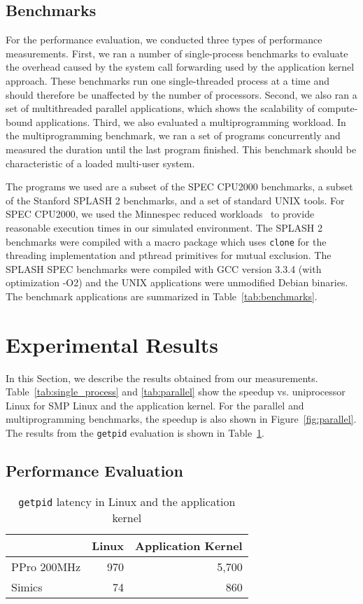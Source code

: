 \subsection{Benchmarks}
For the performance evaluation, we conducted three types of performance
measurements. First, we ran a number of single-process benchmarks to evaluate
the overhead caused by the system call forwarding used by the application
kernel approach. These benchmarks run one single-threaded process at a time
and should therefore be unaffected by the number of processors. Second, we
also ran a set of multithreaded parallel applications, which shows the
scalability of compute-bound applications. Third, we also evaluated a
multiprogramming workload. In the multiprogramming benchmark, we ran a set of
programs concurrently and measured the duration until the last program
finished. This benchmark should be characteristic of a loaded multi-user
system.

The programs we used are a subset of the SPEC CPU2000 benchmarks, a subset of
the Stanford SPLASH 2 benchmarks, and a set of standard UNIX tools. For SPEC
CPU2000, we used the Minnespec reduced workloads~\cite{minnespec} to provide
reasonable execution times in our simulated environment. The SPLASH 2
benchmarks were compiled with a macro package which uses \texttt{clone} for
the threading implementation and pthread primitives for mutual exclusion. The
SPLASH SPEC benchmarks were compiled with GCC version 3.3.4 (with optimization
-O2) and the UNIX applications were unmodified Debian binaries. The benchmark
applications are summarized in Table~\ref{tab:benchmarks}.

\section{Experimental Results}
\label{sec:appkern:results}
In this Section, we describe the results obtained from our measurements.
Table~\ref{tab:single_process} and \ref{tab:parallel} show the speedup vs.
uniprocessor Linux for SMP Linux and the application kernel. For the parallel
and multiprogramming benchmarks, the speedup is also shown in
Figure~\ref{fig:parallel}. The results from the \texttt{getpid} evaluation is
shown in Table~\ref{tab:getpid}.


\subsection{Performance Evaluation}
\begin{table}
  \caption{\texttt{getpid} latency in Linux and the application kernel}
  \begin{center}
    \label{tab:getpid}
    \begin{small}
      \begin{tabular}{l|rr}
        & Linux & Application Kernel \\
        \hline
        PPro 200MHz & 970 & 5,700 \\
        Simics & 74 & 860 \\
      \end{tabular}
    \end{small}
  \end{center}
\end{table}


